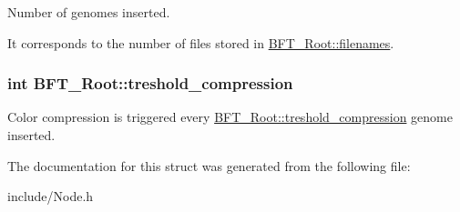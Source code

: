 Number of genomes inserted. 

It corresponds to the number of files stored in \hyperlink{structBFT__Root_a8022a504e2c0dd2d800efda892413ce7}{B\+F\+T\+\_\+\+Root\+::filenames}. 
\subsubsection[{\texorpdfstring{treshold\+\_\+compression}{treshold_compression}}]{\setlength{\rightskip}{0pt plus 5cm}int B\+F\+T\+\_\+\+Root\+::treshold\+\_\+compression}\hypertarget{structBFT__Root_ac791b1bb0df480c8574095bf0444cc64}{}\label{structBFT__Root_ac791b1bb0df480c8574095bf0444cc64}


Color compression is triggered every \hyperlink{structBFT__Root_ac791b1bb0df480c8574095bf0444cc64}{B\+F\+T\+\_\+\+Root\+::treshold\+\_\+compression} genome inserted. 



The documentation for this struct was generated from the following file\+:\begin{DoxyCompactItemize}
\item 
include/Node.\+h\end{DoxyCompactItemize}
